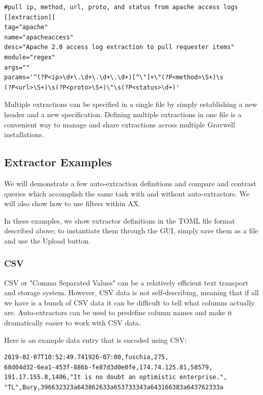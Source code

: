 \begin{Verbatim}[breaklines=true]
#pull ip, method, url, proto, and status from apache access logs
[[extraction]]
tag="apache"
name="apacheaccess"
desc="Apache 2.0 access log extraction to pull requester items"
module="regex"
args=""
params='^(?P<ip>\d+\.\d+\.\d+\.\d+)[^\"]+\"(?P<method>\S+)\s
(?P<url>\S+)\s(?P<proto>\S+)\"\s(?P<status>\d+)'
\end{Verbatim}

Multiple extractions can be specified in a single file by simply
establishing a new \code{[[extraction]]} header and a new
specification. Defining multiple extractions in one file is a convenient
way to manage and share extractions across multiple Gravwell installations.

\subsection{Extractor Examples}

We will demonstrate a few auto-extraction definitions and compare and
contrast queries which accomplish the same task with and without
auto-extractors. We will also show how to use filters within AX.

In these examples, we show extractor definitions in the TOML file format
described above; to instantiate them through the GUI, simply save them as a file and use the Upload button.

\subsubsection{CSV}

CSV or "Comma Separated Values" can be a relatively efficient text
transport and storage system. However, CSV data is not self-describing,
meaning that if all we have is a bunch of CSV data it can be difficult
to tell what columns actually are. Auto-extractors can be used to
predefine column names and make it dramatically easier to work with CSV
data.

Here is an example data entry that is encoded using CSV:

\begin{Verbatim}[breaklines=true]
2019-02-07T10:52:49.741926-07:00,fuschia,275,
68d04d32-6ea1-453f-886b-fe87d3d0e0fe,174.74.125.81,58579,
191.17.155.8,1406,"It is no doubt an optimistic enterprise.",
"TL",Bury,396632323a643862633a653733343a643166383a643762333a
\end{Verbatim}

